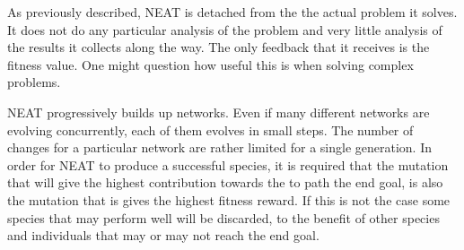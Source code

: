 
As previously described, NEAT is detached from the the actual problem it solves. It does not do any particular analysis of the problem and very little analysis of the results it collects along the way. The only feedback that it receives is the fitness value. One might question how useful this is when solving complex problems.

NEAT progressively builds up networks. Even if many different networks are evolving concurrently, each of them evolves in small steps. The number of changes for a particular network are rather limited for a single generation. In order for NEAT to produce a successful species, it is required that the mutation that will give the highest contribution towards the to path the end goal, is also the mutation that is gives the highest fitness reward. If this is not the case some species that may perform well will be discarded, to the benefit of other species and individuals that may or may not reach the end goal.

